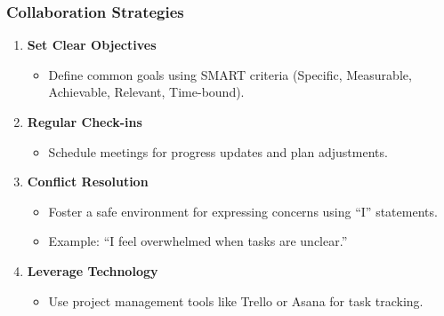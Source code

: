 \documentclass[aspectratio=169]{beamer}
\begin{document}
\begin{frame}[fragile]
    \frametitle{Collaboration Strategies}
    \begin{enumerate}
        \item \textbf{Set Clear Objectives} 
        \begin{itemize}
            \item Define common goals using SMART criteria (Specific, Measurable, Achievable, Relevant, Time-bound).
        \end{itemize}

        \item \textbf{Regular Check-ins} 
        \begin{itemize}
            \item Schedule meetings for progress updates and plan adjustments.
        \end{itemize}

        \item \textbf{Conflict Resolution} 
        \begin{itemize}
            \item Foster a safe environment for expressing concerns using “I” statements.
            \item Example: “I feel overwhelmed when tasks are unclear.”
        \end{itemize}

        \item \textbf{Leverage Technology} 
        \begin{itemize}
            \item Use project management tools like Trello or Asana for task tracking.
        \end{itemize}
    \end{enumerate}
\end{frame}
\end{document}
